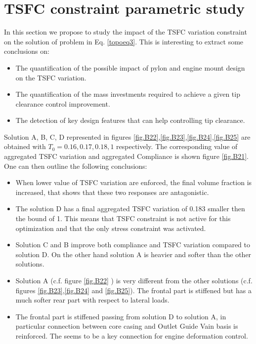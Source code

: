 \section{TSFC constraint parametric study}
\label{TSFCpareto}
In this section we propose to study the impact of the TSFC variation constraint on the solution of problem in Eq. \ref{topoeq3}. This is interesting to extract some conclusions on:
\begin{itemize}
\item The quantification of the possible impact of pylon and engine mount design on the TSFC variation.
\item The quantification of the mass investments required to achieve a given tip clearance control improvement.
\item The detection of key design features that can help controlling tip clearance.
\end{itemize} 
Solution A, B, C, D represented in figures \ref{fig.B22},\ref{fig.B23},\ref{fig.B24},\ref{fig.B25} are obtained with $T_0=0.16,0.17,0.18,1$ respectively. The corresponding value of aggregated TSFC variation and aggregated Compliance is shown figure \ref{fig.B21}. 
One can then outline the following conclusions:
\begin{itemize}
\item When lower value of TSFC variation are enforced, the final volume fraction is increased, that shows that these two responses are antagonistic.
\item The solution D has a final aggregated TSFC variation of 0.183 smaller then the bound of 1. This means that TSFC constraint is not active for this optimization and that the only stress constraint was activated.
\item Solution C and B improve both compliance and TSFC variation compared to solution D. On the other hand solution A is heavier and softer than the other solutions.
\item Solution A (c.f. figure \ref{fig.B22} ) is very different from the other solutions (c.f. figures \ref{fig.B23},\ref{fig.B24} and \ref{fig.B25}). The frontal part is stiffened but has a much softer rear part with respect to lateral loads. 
\item The frontal part is stiffened passing from solution D to solution A, in particular connection between core casing and Outlet Guide Vain basis is reinforced. The seems to be a key connection for engine deformation control.
\end{itemize} 
